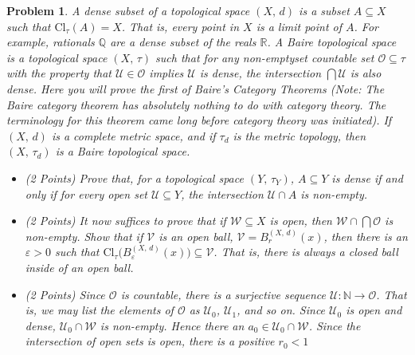 \documentclass{article}
\theoremstyle{normal}
\newtheorem{problem}{Problem}
\begin{document}
    \begin{problem}
        A dense subset of a topological space $(X,\,d)$ is a subset
        $A\subseteq{X}$ such that $\textrm{Cl}_{\tau}(A)=X$. That is, every
        point in $X$ is a limit point of $A$. For example, rationals
        $\mathbb{Q}$ are a dense subset of the reals $\mathbb{R}$.
        A Baire topological space is a topological space $(X,\,\tau)$ such that
        for any non-emptyset countable set $\mathcal{O}\subseteq\tau$ with the
        property that $\mathcal{U}\in\mathcal{O}$ implies $\mathcal{U}$ is
        dense, the intersection $\bigcap\mathcal{U}$ is also dense. Here you
        will prove the first of Baire's Category Theorems (Note: The Baire
        category theorem has absolutely nothing to do with category theory.
        The terminology for this theorem came long before category theory was
        initiated). If $(X,\,d)$ is a complete metric space, and if
        $\tau_{d}$ is the metric topology, then $(X,\,\tau_{d})$ is a Baire
        topological space.
        \begin{itemize}
            \item (2 Points) Prove that, for a topological space
                $(Y,\,\tau_{Y})$, $A\subseteq{Y}$ is dense if and only if
                for every open set $\mathcal{U}\subseteq{Y}$, the
                intersection $\mathcal{U}\cap{A}$ is non-empty.
            \item (2 Points) It now suffices to prove that if
                $\mathcal{W}\subseteq{X}$ is open, then
                $\mathcal{W}\cap\bigcap\mathcal{O}$ is non-empty. Show that if
                $\mathcal{V}$ is an open ball,
                $\mathcal{V}=B_{r}^{(X,\,d)}(x)$, then there is an
                $\varepsilon>0$ such that
                $\textrm{Cl}_{\tau}\big(B_{\varepsilon}^{(X,\,d)}(x)\big)\subseteq\mathcal{V}$.
                That is, there is always a \textit{closed ball} inside of an
                open ball.
            \item (2 Points) Since $\mathcal{O}$ is countable, there is a surjective
                sequence $\mathcal{U}:\mathbb{N}\rightarrow\mathcal{O}$. That
                is, we may list the elements of $\mathcal{O}$ as $\mathcal{U}_{0}$,
                $\mathcal{U}_{1}$, and so on. Since $\mathcal{U}_{0}$ is open
                and dense, $\mathcal{U}_{0}\cap\mathcal{W}$ is non-empty. Hence
                there an $a_{0}\in\mathcal{U}_{0}\cap\mathcal{W}$. Since the
                intersection of open sets is open, there is a positive $r_{0}<1$

\end{itemize}
\end{problem}
\end{document}
